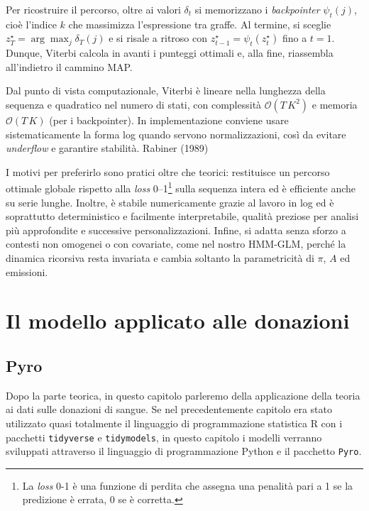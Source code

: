 \documentclass[
  italian,
  a4paper,
  a4paper,
  twoside,
  open=right,
  12pt]{scrbook}
\theoremstyle{definition}
\theoremstyle{remark}
\begin{document}
Per ricostruire il percorso, oltre ai valori \(\delta_t\) si memorizzano
i \emph{backpointer} \(\psi_t(j)\), cioè l'indice \(k\) che massimizza
l'espressione tra graffe. Al termine, si sceglie
\(z_T^\star=\arg\max_j \delta_T(j)\) e si risale a ritroso con
\(z_{t-1}^\star=\psi_t(z_t^\star)\) fino a \(t=1\). Dunque, Viterbi
calcola in avanti i punteggi ottimali e, alla fine, riassembla
all'indietro il cammino MAP.

Dal punto di vista computazionale, Viterbi è lineare nella lunghezza
della sequenza e quadratico nel numero di stati, con complessità
\(\mathcal{O}(T\,K^2)\) e memoria \(\mathcal{O}(T\,K)\) (per i
backpointer). In implementazione conviene usare sistematicamente la
forma log quando servono normalizzazioni, così da evitare
\emph{underflow} e garantire stabilità. Rabiner (1989)

I motivi per preferirlo sono pratici oltre che teorici: restituisce un
percorso ottimale globale rispetto alla \emph{loss} 0--1\footnote{La
  \emph{loss} 0-1 è una funzione di perdita che assegna una penalità
  pari a 1 se la predizione è errata, 0 se è corretta.} sulla sequenza
intera ed è efficiente anche su serie lunghe. Inoltre, è stabile
numericamente grazie al lavoro in log ed è soprattutto deterministico e
facilmente interpretabile, qualità preziose per analisi più approfondite
e successive personalizzazioni. Infine, si adatta senza sforzo a
contesti non omogenei o con covariate, come nel nostro HMM-GLM, perché
la dinamica ricorsiva resta invariata e cambia soltanto la parametricità
di \(\pi\), \(A\) ed emissioni.

\section{Il modello applicato alle
donazioni}\label{il-modello-applicato-alle-donazioni}

\subsection{Pyro}\label{sec-pyro}

Dopo la parte teorica, in questo capitolo parleremo della applicazione
della teoria ai dati sulle donazioni di sangue. Se nel precedentemente
capitolo era stato utilizzato quasi totalmente il linguaggio di
programmazione statistica R con i pacchetti \texttt{tidyverse} e
\texttt{tidymodels}, in questo capitolo i modelli verranno sviluppati
attraverso il linguaggio di programmazione Python e il pacchetto
\texttt{Pyro}.
\end{document}
